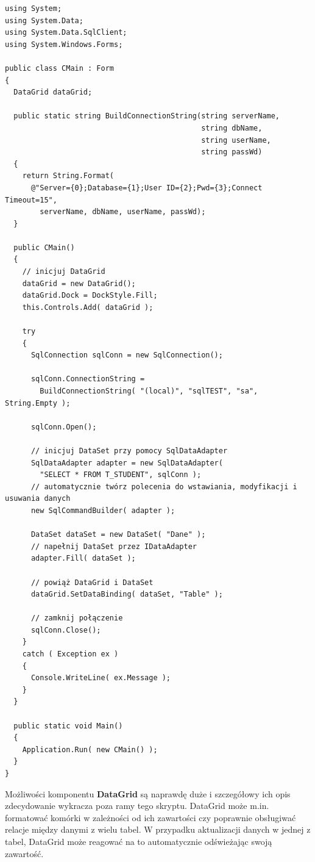 \begin{scriptsize}
\begin{verbatim}
using System;
using System.Data;
using System.Data.SqlClient;
using System.Windows.Forms;

public class CMain : Form
{
  DataGrid dataGrid;

  public static string BuildConnectionString(string serverName, 
                                             string dbName, 
                                             string userName, 
                                             string passWd)
  {
    return String.Format(  
      @"Server={0};Database={1};User ID={2};Pwd={3};Connect Timeout=15", 
        serverName, dbName, userName, passWd);
  }

  public CMain()
  {
    // inicjuj DataGrid
    dataGrid = new DataGrid();
    dataGrid.Dock = DockStyle.Fill;
    this.Controls.Add( dataGrid );

    try
    {
      SqlConnection sqlConn = new SqlConnection();
      	
      sqlConn.ConnectionString = 
        BuildConnectionString( "(local)", "sqlTEST", "sa", String.Empty );

      sqlConn.Open();

      // inicjuj DataSet przy pomocy SqlDataAdapter
      SqlDataAdapter adapter = new SqlDataAdapter( 
        "SELECT * FROM T_STUDENT", sqlConn );
      // automatycznie twórz polecenia do wstawiania, modyfikacji i usuwania danych
      new SqlCommandBuilder( adapter );

      DataSet dataSet = new DataSet( "Dane" );
      // napełnij DataSet przez IDataAdapter
      adapter.Fill( dataSet );

      // powiąż DataGrid i DataSet 
      dataGrid.SetDataBinding( dataSet, "Table" );
      
      // zamknij połączenie
      sqlConn.Close();
    }
    catch ( Exception ex )
    {
      Console.WriteLine( ex.Message );
    } 
  }

  public static void Main()
  {
    Application.Run( new CMain() );
  }  
}
\end{verbatim}
\end{scriptsize}

Możliwości komponentu {\bf DataGrid} są naprawdę duże i szczegółowy ich opis zdecydowanie wykracza 
poza ramy tego skryptu. DataGrid może m.in. formatować komórki w zależności od ich zawartości czy
poprawnie obsługiwać relacje między danymi z wielu tabel. W przypadku aktualizacji danych w jednej z tabel,
DataGrid może reagować na to automatycznie odświeżając swoją zawartość.